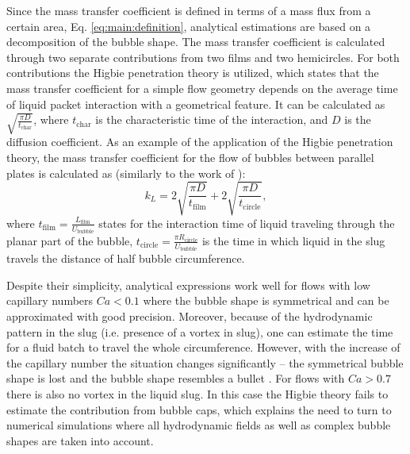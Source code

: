 \documentclass{article}
\newcommand{\beq}{\begin{equation}}
\newcommand{\feq}{\end{equation}}
\newcommand{\lfilm}{L_{\mathrm{film}}}
\newcommand{\ububble}{U_{\mathrm{bubble}}}
\begin{document}
Since the mass transfer coefficient is defined in terms of a mass flux from a certain area, Eq. \ref{eq:main:definition},
analytical estimations \cite{kreutzer-overview,irandoust} are based on a decomposition of the bubble shape. The mass
 transfer coefficient is calculated through two separate contributions from two films and two hemicircles. For both 
contributions the Higbie penetration theory \cite{higbie} is utilized, which states that the mass transfer coefficient
 for a simple flow geometry depends on the average time of liquid packet interaction with a geometrical feature. It 
can be calculated as $\sqrt{\frac{\pi D}{t_{\mathrm{char}}}}$, where $t_{\mathrm{char}}$ is the characteristic 
time of the interaction, and $D$ is the diffusion coefficient. As an example of the application of the Higbie penetration theory,
 the mass  transfer coefficient 
for the flow of bubbles between parallel plates  is calculated as (similarly to the work of \citet{vanbaten-circular}):
\beq
k_L=2 \sqrt{\frac{\pi D}{t_{\mathrm{film}}}}+2 \sqrt{\frac{\pi D}{t_{\mathrm{circle}}}},
\feq
where $t_{\mathrm{film}}=\frac{\lfilm}{\ububble}$ states for the interaction time of liquid traveling through the planar part
 of the bubble, $t_{\mathrm{circle}}=\frac{\pi R_{\mathrm{circle}}}{\ububble}$ is the time in which liquid in the slug travels the distance of half bubble circumference. 

Despite their simplicity, analytical expressions work well for flows with low
capillary numbers $Ca<0.1$ \cite{bercic-mass} where the bubble shape is
symmetrical and can be approximated with good precision. Moreover, because of the
hydrodynamic pattern in the slug (i.e. presence of a vortex in slug), one can
estimate the time for a fluid batch to travel the whole circumference.   However,
with the increase of the capillary number the situation changes significantly -- the
symmetrical bubble shape is lost and the bubble shape resembles a bullet \cite{kuzmin-binary2d}.
For flows with $Ca>0.7$ there is also no vortex in the liquid slug. In this case the Higbie theory fails
to estimate the contribution from bubble caps, which explains the need to turn to numerical simulations where all
hydrodynamic fields as well as complex bubble shapes are taken into account.
\end{document}
